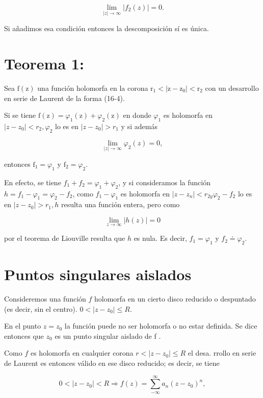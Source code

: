 \documentclass[10pt]{article}
\theoremstyle{plain}
\theoremstyle{definition}
\theoremstyle{remark}
\begin{document}
$$
\lim _{|z| \rightarrow \infty}\left|f_{2}(z)\right|=0 .
$$

Si añadimos esa condición entonces la descomposición sí es única.

\section*{Teorema 1:}
Sea $\mathrm{f}(\mathrm{z})$ una función holomorfa en la corona $\mathrm{r}_{1}<\left|\mathrm{z}-\mathrm{z}_{0}\right|<\mathrm{r}_{2}$ con un desarrollo en serie de Laurent de la forma (16-4).

Si se tiene $\mathrm{f}(\mathrm{z})=\varphi_{1}(\mathrm{z})+\varphi_{2}(\mathrm{z})$ en donde $\varphi_{1}$ es holomorfa en $\left|z-z_{0}\right|<r_{2}, \varphi_{2}$ lo es en $\left|z-z_{0}\right|>r_{1}$ y si además

$$
\lim _{|z| \rightarrow \infty} \varphi_{2}(z)=0,
$$

entonces $\mathrm{f}_{1}=\varphi_{1}$ y $\mathrm{f}_{2}=\varphi_{2}$.

En efecto, se tiene $f_{1}+f_{2}=\varphi_{1}+\varphi_{2}$, y si consideramos la función $h=f_{1}-\varphi_{1}=\varphi_{2}-f_{2}$, como $f_{1}-\varphi_{1}$ es holomorfa en $\left|z-z_{n}\right|<r_{2 y} \varphi_{2}-f_{2}$ lo es en $\left|z-z_{0}\right|>r_{1}, h$ resulta una función entera, pero como

$$
\lim _{z \rightarrow \infty}|h(z)|=0
$$

por el teorema de Liouville resulta que $h$ es nula. Es decir, $f_{1}=\varphi_{1}$ y $f_{2} \doteq \varphi_{2}$.

\section{Puntos singulares aislados}
Consideremos una función $f$ holomorfa en un cierto disco reducido o despuntado (es decir, sin el centro). $0<\left|z-z_{0}\right| \leqslant R$.

En el punto $z=z_{0}$ la función puede no ser holomorfa o no estar definida. Se dice entonces que $z_{0}$ es un punto singular aislado de f .

Como $f$ es holomorfa en cualquier corona $r<\left|z-z_{0}\right| \leqslant R$ el desa. rrollo en serie de Laurent es entonces válido en ese disco reducido; es decir, se tiene


\begin{equation*}
0<\left|z-z_{0}\right|<R \Rightarrow f(z)=\sum_{-\infty}^{\infty} a_{n}\left(z-z_{0}\right)^{n}, \tag{17-1}
\end{equation*}
\end{document}
